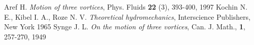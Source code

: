 \documentclass[polish,a4paper]{article}
\begin{document}
\begin{thebibliography}{1}
{\small %
 Aref H.  \textit{Motion of three vortices}, Phys. Fluids \textbf{22} (3), 393-400, 1997
 Kochin N. E.,  Kibel I. A., Roze N. V. \textit{Theoretical hydromechanics}, Interscience Publishers, New York 1965
 Synge J. L. \textit{On the motion of three vortices}, Can. J. Math., \textbf{1}, 257-270, 1949
}
\end{thebibliography}
\end{document}
